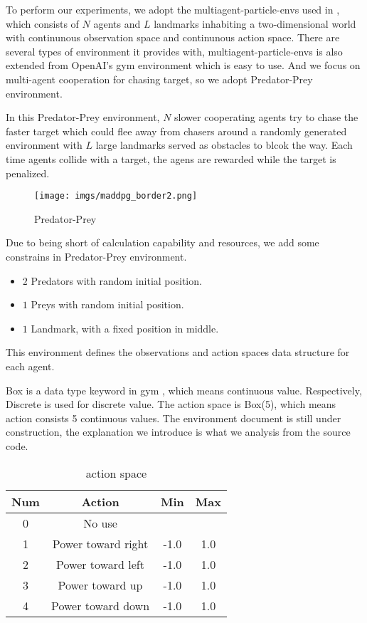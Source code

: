 \documentclass[11pt,twocolumn]{jarticle} %
\begin{document}
To perform our experiments, we adopt the multiagent-particle-envs used in \cite{maddpg}, which consists of $N$ agents and $L$ landmarks inhabiting a two-dimensional world with continunous observation space and continunous action space. There are several types of environment it provides with, multiagent-particle-envs is also extended from OpenAI's gym \cite{gym} environment which is easy to use. And we focus on multi-agent cooperation for chasing target, so we adopt Predator-Prey environment. \par
In this Predator-Prey environment, $N$ slower cooperating agents try to chase the faster target which could flee away from chasers around a randomly generated environment with $L$ large landmarks served as obstacles to blcok the way. Each time agents collide with a target, the agens are rewarded while the target is penalized. \par
\begin{figure}[t]
 \begin{center}
  \texttt{[image: imgs/maddpg\_border2.png]}
  \caption{Predator-Prey}
  \label{fig:adversaryChasing}
 \end{center}
\end{figure}
Due to being short of calculation capability and resources, we add some constrains in Predator-Prey environment.
\begin{itemize}
  \item $2$ Predators with random initial position.
  \item $1$ Preys with random initial position.
  \item $1$ Landmark, with a fixed position in middle.
\end{itemize}
This environment defines the observations and action spaces data structure for each agent. \par
Box is a data type keyword in gym \cite{gym}, which means continuous value. Respectively, Discrete is used for discrete value. The action space is Box(5), which means action consists 5 continuous values. The environment document is still under construction, the explanation we introduce is what we analysis from the source code. 
\begin{table}[ht]
 \caption{action space} 
 \label{tbl:action}
  \begin{center}
    \begin{tabular}{c|ccc}
  Num  & Action & Min & Max\\
  \hline \hline
  0 & No use &  & \\
  1 & Power toward right & -1.0 & 1.0\\
  2 & Power toward left & -1.0 & 1.0\\
  3 & Power toward up & -1.0 & 1.0\\
  4 & Power toward down & -1.0 & 1.0\\\hline
    \end{tabular}
  \end{center}
\end{table}
\end{document}
